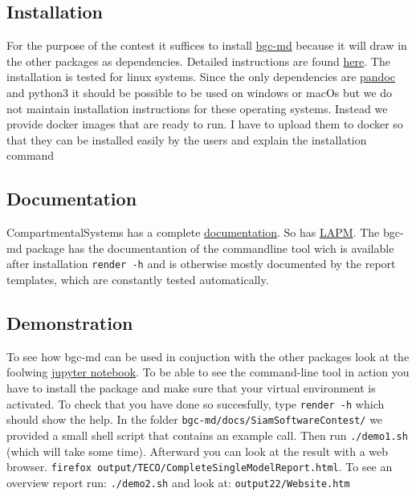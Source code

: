 \documentclass[a4paper]{article}
\begin{document}
\subsection{Installation}
For the purpose of the contest it suffices to install \href{https://github.com/MPIBGC-TEE/bgc-md}{bgc-md} because it will draw in the other packages as dependencies. Detailed instructions are found \href{https://github.com/MPIBGC-TEE/bgc-md#installation}{here}.
The installation is tested for linux systems. Since the only dependencies are \href{https://pandoc.org/installing.html}{pandoc} and python3 it should be possible to be used on windows or macOs but we do not maintain installation instructions for these operating systems.
Instead we provide docker images that are ready to run. {\color{red} I have to upload them to  docker so that they can be installed easily by the users and explain the installation command}


\subsection{Documentation}
CompartmentalSystems has a complete \href{http://compartmentalsystems.readthedocs.io/en/latest/}{documentation}.
So has \href{http://lapm.readthedocs.io/en/latest/}{LAPM}. The bgc-md package has the documentantion of the commandline tool wich is available after installation \texttt{render -h} 
and is otherwise mostly documented by the report templates, which are constantly tested automatically.

\subsection{Demonstration}
To see how bgc-md can be used in conjuction with the other packages look at the foolwing \href{https://github.com/MPIBGC-TEE/bgc-md/blob/master/jupyter_notebooks/Examples/how_to_apply_toolkit_to_yaml_model.ipynb}{jupyter notebook}.
To be able to see the command-line tool in action you have to install the package and make sure that your virtual environment is activated. 
To check that you have done so succesfully, type \texttt{render -h} which should show the help.
In the folder \texttt{bgc-md/docs/SiamSoftwareContest/} we provided a small shell script that contains an example call. 
Then run \texttt{./demo1.sh} (which will take some time).
Afterward you can look at the result with a web browser.
\texttt{firefox output/TECO/CompleteSingleModelReport.html}.
To see an overview report run: \texttt{./demo2.sh} and look at: \texttt{output22/Website.htm}
\end{document}
